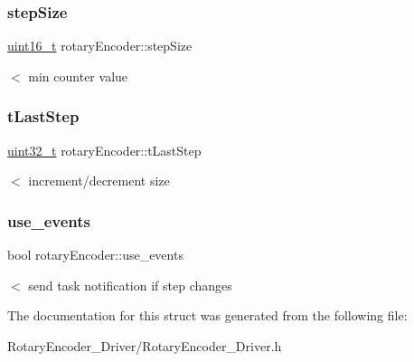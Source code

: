 \subsubsection{\texorpdfstring{step\+Size}{stepSize}}
{\footnotesize\ttfamily \hyperlink{vl53l0x__types_8h_a273cf69d639a59973b6019625df33e30}{uint16\+\_\+t} rotary\+Encoder\+::step\+Size}

$<$ min counter value \mbox{\label{structrotaryEncoder_ab0862deb9b39139e677189738940dc2c}} 
\subsubsection{\texorpdfstring{t\+Last\+Step}{tLastStep}}
{\footnotesize\ttfamily \hyperlink{vl53l0x__types_8h_a435d1572bf3f880d55459d9805097f62}{uint32\+\_\+t} rotary\+Encoder\+::t\+Last\+Step}

$<$ increment/decrement size \mbox{\label{structrotaryEncoder_a99b65d81c239da055c1095045e075cf7}} 
\subsubsection{\texorpdfstring{use\+\_\+events}{use\_events}}
{\footnotesize\ttfamily bool rotary\+Encoder\+::use\+\_\+events}

$<$ send task notification if step changes 

The documentation for this struct was generated from the following file\+:\begin{DoxyCompactItemize}
\item 
Rotary\+Encoder\+\_\+\+Driver/Rotary\+Encoder\+\_\+\+Driver.\+h\end{DoxyCompactItemize}
